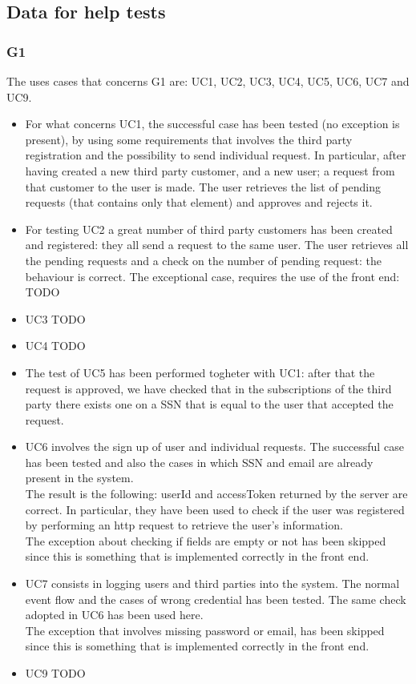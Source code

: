 \subsection{Data for help tests}
\subsubsection{G1}
The uses cases that concerns G1 are: UC1, UC2, UC3, UC4, UC5, UC6, UC7 and UC9.  \\

\begin{itemize}
\item For what concerns UC1, the successful case has been tested (no exception is present), by using some requirements that involves the
third party registration and the possibility to send individual request. In particular, after having created a new third party customer,
and a new user; a request from that customer to the user is made. The user retrieves the list of pending requests (that contains only that
element) and approves and rejects it.

\item For testing UC2 a great number of third party customers has been created and registered: they all send a request to the same user.
The user retrieves all the pending requests and a check on the number of pending request: the behaviour is correct.
The exceptional case, requires the use of the front end: TODO

\item UC3 TODO

\item UC4 TODO

\item The test of UC5 has been performed togheter with UC1: after that the request is approved, we have checked that in the subscriptions
of the third party there exists one on a SSN that is equal to the user that accepted the request.

\item UC6 involves the sign up of user and individual requests. The successful case has been tested and also the cases in which SSN and email
are already present in the system. \\
The result is the following: userId and accessToken returned by the server are correct. In particular, they have been used to check
if the user was registered by performing an http request to retrieve the user's information.  \\
The exception about checking if fields are empty or not has been skipped since this is something that is implemented correctly in the front
end.

\item UC7 consists in logging users and third parties into the system. The normal event flow and the cases of wrong credential has been
tested.
The same check adopted in UC6 has been used here. \\ 
The exception that involves missing password or email, has been skipped since this is something that is implemented correctly in the front 
end.

\item UC9 TODO

\end{itemize}
